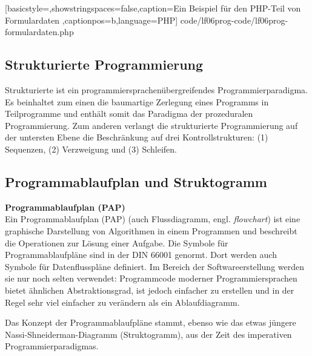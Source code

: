 
	[basicstyle=\small,showstringspaces=false,caption={Ein Beispiel für den PHP-Teil von Formulardaten}
	\label{lst:html-formulardaten},captionpos=b,language=PHP]
	{code/lf06prog-code/lf06prog-formulardaten.php}

\subsection{Strukturierte Programmierung}
Strukturierte ist ein programmiersprachenübergreifendes Programmierparadigma. Es beinhaltet zum einen die baumartige Zerlegung eines Programms in Teilprogramme und enthält somit das Paradigma der prozeduralen Programmierung. Zum anderen verlangt die strukturierte Programmierung auf der untersten Ebene die Beschränkung auf drei Kontrollstrukturen: (1) Sequenzen, (2) Verzweigung und (3) Schleifen.


\subsection{Programmablaufplan und Struktogramm}

{\bf Programmablaufplan (PAP)}~\\

Ein Programmablaufplan (PAP) (auch Flussdiagramm, engl. {\it flowchart}) ist eine graphische Darstellung von Algorithmen in einem Programmen und beschreibt die Operationen zur Lösung einer Aufgabe. Die Symbole für Programmablaufpläne sind in der DIN 66001 genormt. Dort werden auch Symbole für Datenflusspläne definiert. Im Bereich der Softwareerstellung werden sie nur noch selten verwendet: Programmcode moderner Programmiersprachen bietet ähnlichen Abstraktionsgrad, ist jedoch einfacher zu erstellen und in der Regel sehr viel einfacher zu verändern als ein Ablaufdiagramm.

Das Konzept der Programmablaufpläne stammt, ebenso wie das etwas jüngere Nassi-Shneiderman-Diagramm (Struktogramm), aus der Zeit des imperativen
Programmierparadigmas.


